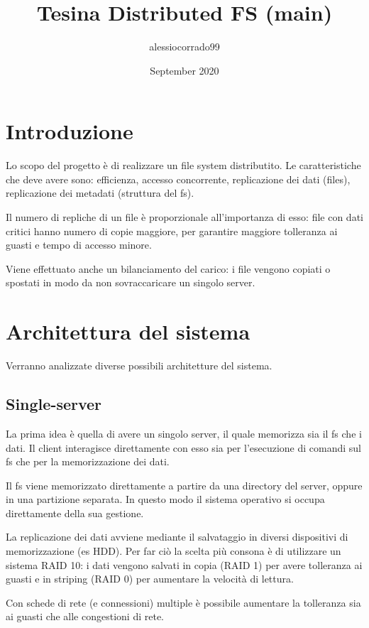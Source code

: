 \documentclass{article}
\title{Tesina Distributed FS (main)}
\author{alessiocorrado99 }
\date{September 2020}
\begin{document}
\maketitle

\section{Introduzione}

Lo scopo del progetto è di realizzare un file system distributito. 
Le caratteristiche che deve avere sono: efficienza, accesso concorrente, replicazione dei dati (files), replicazione dei metadati (struttura del fs).

Il numero di repliche di un file è proporzionale all'importanza di esso: file con dati critici hanno numero di copie maggiore, per garantire maggiore tolleranza ai guasti e tempo di accesso minore.

Viene effettuato anche un bilanciamento del carico: i file vengono copiati o spostati in modo da non sovraccaricare un singolo server. 



\section{Architettura del sistema}

Verranno analizzate diverse possibili architetture del sistema.

\subsection{Single-server}

La prima idea è quella di avere un singolo server, il quale memorizza sia il fs che i dati. Il client interagisce direttamente con esso sia per l'esecuzione di comandi sul fs che per la memorizzazione dei dati.

Il fs viene memorizzato direttamente a partire da una directory del server, oppure in una partizione separata. In questo modo il sistema operativo si occupa direttamente della sua gestione.

La replicazione dei dati avviene mediante il salvataggio in diversi dispositivi di memorizzazione (es HDD). Per far ciò la scelta più consona è di utilizzare un sistema RAID 10: i dati vengono salvati in copia (RAID 1) per avere tolleranza ai guasti e in striping (RAID 0) per aumentare la velocità di lettura. 

Con schede di rete (e connessioni) multiple è possibile aumentare la tolleranza sia ai guasti che alle congestioni di rete. 
\end{document}
